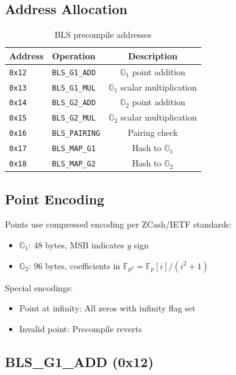 \documentclass[11pt,a4paper]{article}
\theoremstyle{definition}
\begin{document}
\subsection{Address Allocation}

\begin{table}[h]
\centering
\begin{tabular}{llc}
\toprule
\textbf{Address} & \textbf{Operation} & \textbf{Description} \\
\midrule
\texttt{0x12} & \texttt{BLS\_G1\_ADD} & $\mathbb{G}_1$ point addition \\
\texttt{0x13} & \texttt{BLS\_G1\_MUL} & $\mathbb{G}_1$ scalar multiplication \\
\texttt{0x14} & \texttt{BLS\_G2\_ADD} & $\mathbb{G}_2$ point addition \\
\texttt{0x15} & \texttt{BLS\_G2\_MUL} & $\mathbb{G}_2$ scalar multiplication \\
\texttt{0x16} & \texttt{BLS\_PAIRING} & Pairing check \\
\texttt{0x17} & \texttt{BLS\_MAP\_G1} & Hash to $\mathbb{G}_1$ \\
\texttt{0x18} & \texttt{BLS\_MAP\_G2} & Hash to $\mathbb{G}_2$ \\
\bottomrule
\end{tabular}
\caption{BLS precompile addresses}
\label{tab:addresses}
\end{table}

\subsection{Point Encoding}

Points use compressed encoding per ZCash/IETF standards:

\begin{itemize}
    \item \textbf{$\mathbb{G}_1$}: 48 bytes, MSB indicates $y$ sign
    \item \textbf{$\mathbb{G}_2$}: 96 bytes, coefficients in $\mathbb{F}_{p^2} = \mathbb{F}_p[i]/(i^2 + 1)$
\end{itemize}

Special encodings:
\begin{itemize}
    \item Point at infinity: All zeros with infinity flag set
    \item Invalid point: Precompile reverts
\end{itemize}

\subsection{BLS\_G1\_ADD (0x12)}
\end{document}
